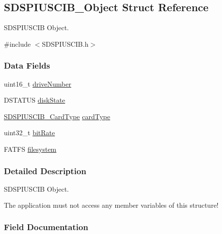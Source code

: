 \subsection{S\-D\-S\-P\-I\-U\-S\-C\-I\-B\-\_\-\-Object Struct Reference}
\label{struct_s_d_s_p_i_u_s_c_i_b___object}


S\-D\-S\-P\-I\-U\-S\-C\-I\-B Object.  




{\ttfamily \#include $<$S\-D\-S\-P\-I\-U\-S\-C\-I\-B.\-h$>$}

\subsubsection*{Data Fields}
\begin{DoxyCompactItemize}
\item 
uint16\-\_\-t \hyperlink{struct_s_d_s_p_i_u_s_c_i_b___object_ab6b2fabeb6f979e53c0c45cec5a6d077}{drive\-Number}
\item 
D\-S\-T\-A\-T\-U\-S \hyperlink{struct_s_d_s_p_i_u_s_c_i_b___object_a8a06926e3f24ad32bfdfc137e83bfe33}{disk\-State}
\item 
\hyperlink{_s_d_s_p_i_u_s_c_i_b_8h_a82051f5c4a349b60bc2205ec32cd74c1}{S\-D\-S\-P\-I\-U\-S\-C\-I\-B\-\_\-\-Card\-Type} \hyperlink{struct_s_d_s_p_i_u_s_c_i_b___object_a53b9575a67a6518c5851911c8a964490}{card\-Type}
\item 
uint32\-\_\-t \hyperlink{struct_s_d_s_p_i_u_s_c_i_b___object_a2ce744b1a395098f2c7374672a80b775}{bit\-Rate}
\item 
F\-A\-T\-F\-S \hyperlink{struct_s_d_s_p_i_u_s_c_i_b___object_ab60030313e4f2c6eb0d3b523d38ad5f4}{filesystem}
\end{DoxyCompactItemize}


\subsubsection{Detailed Description}
S\-D\-S\-P\-I\-U\-S\-C\-I\-B Object. 

The application must not access any member variables of this structure! 

\subsubsection{Field Documentation}
